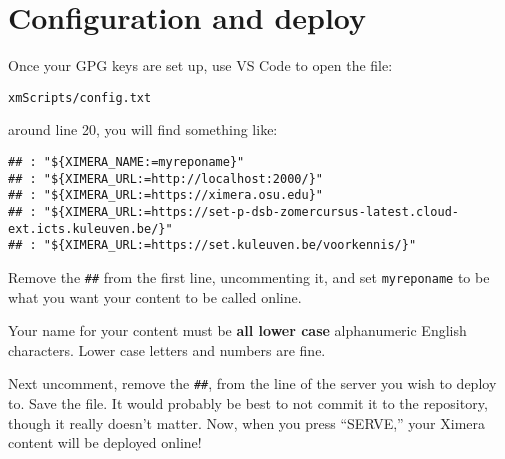 \documentclass{ximera}
\begin{document}

\section{Configuration and deploy}

Once your GPG keys are set up, use VS Code to open the file:
\begin{verbatim}
xmScripts/config.txt
\end{verbatim}
around line 20, you will find something like:
\begin{verbatim}
## : "${XIMERA_NAME:=myreponame}"
## : "${XIMERA_URL:=http://localhost:2000/}"
## : "${XIMERA_URL:=https://ximera.osu.edu}"
## : "${XIMERA_URL:=https://set-p-dsb-zomercursus-latest.cloud-ext.icts.kuleuven.be/}"
## : "${XIMERA_URL:=https://set.kuleuven.be/voorkennis/}"
\end{verbatim}
Remove the \verb!##! from the first line, uncommenting it, and set
\verb!myreponame! to be what
you want your content to be called online.
\begin{warning}
    Your name for your content must be \textbf{all lower case} alphanumeric
    English characters. Lower case letters and numbers are fine.
\end{warning}
Next uncomment, remove the \verb!##!, from the line of the server you wish to
deploy to. Save the file. It would probably be best to not commit it to the
repository, though it really doesn't matter. Now, when you press ``SERVE,'' your Ximera content will be deployed online!
\end{document}
